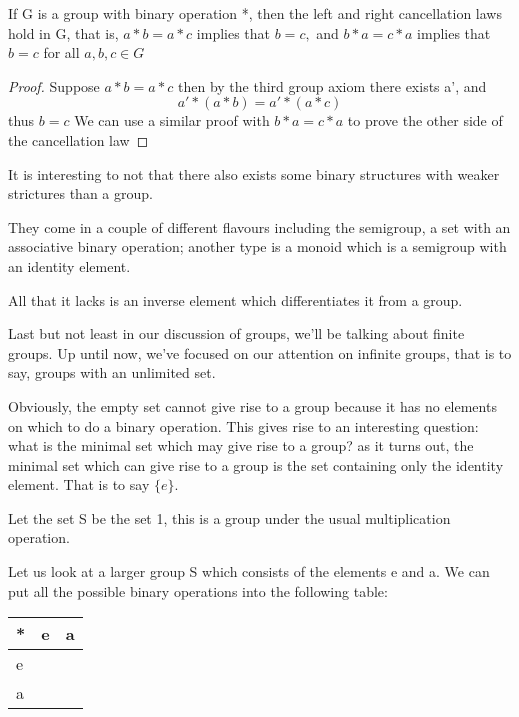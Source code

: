 \begin{theorem}
If G is a group with binary operation *, then the left and right cancellation laws hold in G, that is, $a*b = a*c$ implies that $b=c,$ and $b*a = c*a$ implies that $b=c$ for all $a,b,c \in G$ 
\end{theorem}

\begin{proof}
Suppose $a*b=a*c$ then by the third group axiom there exists a', and $$a'*(a*b) = a'*(a*c)$$ thus $b=c$ \newline
We can use a similar proof with $b*a=c*a$ to prove the other side of the cancellation law
\end{proof}

It is interesting to not that there also exists some binary structures with weaker strictures than a group. \newline

They come in a couple of different flavours including the semigroup, a set with an associative binary operation; another type is a monoid which is a semigroup with an identity element. \newline

All that it lacks is an inverse element which differentiates it from a group.\newline

Last but not least in our discussion of groups, we'll be talking about finite groups. Up until now, we've focused on our attention on infinite groups, that is to say, groups with an unlimited set. \newline

Obviously, the empty set cannot give rise to a group because it has no elements on which to do a binary operation. \newline
This gives rise to an interesting question: what is the minimal set which may give rise to a group? \newline
as it turns out, the minimal set which can give rise to a group is the set containing only the identity element. That is to say $\{ e \}.$

\begin{example}
Let the set S be the set 1, this is a group under the usual multiplication operation.
\end{example}

Let us look at a larger group S which consists of the elements e and a. We can put all the possible binary operations into the following table:

\begin{center}
\begin{tabular} {| l || c | r |}
  \hline
  * & e & a \\ \hline \hline
  e &   &   \\ \hline
  a &   &   \\ \hline

\end{tabular}
\end{center}

